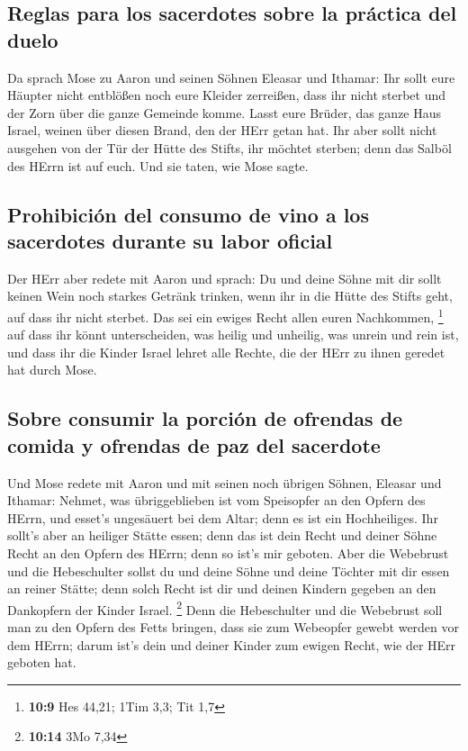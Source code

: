 \hypertarget{reglas-para-los-sacerdotes-sobre-la-pruxe1ctica-del-duelo}{%
\subsection{Reglas para los sacerdotes sobre la práctica del
duelo}\label{reglas-para-los-sacerdotes-sobre-la-pruxe1ctica-del-duelo}}

 Da sprach Mose zu Aaron und seinen Söhnen Eleasar und
Ithamar: Ihr sollt eure Häupter nicht entblößen noch eure Kleider
zerreißen, dass ihr nicht sterbet und der Zorn über die ganze Gemeinde
komme. Lasst eure Brüder, das ganze Haus Israel, weinen über diesen
Brand, den der HErr getan hat.  Ihr aber sollt nicht
ausgehen von der Tür der Hütte des Stifts, ihr möchtet sterben; denn das
Salböl des HErrn ist auf euch. Und sie taten, wie Mose sagte.

\hypertarget{prohibiciuxf3n-del-consumo-de-vino-a-los-sacerdotes-durante-su-labor-oficial}{%
\subsection{Prohibición del consumo de vino a los sacerdotes durante su
labor
oficial}\label{prohibiciuxf3n-del-consumo-de-vino-a-los-sacerdotes-durante-su-labor-oficial}}

 Der HErr aber redete mit Aaron und sprach: 
Du und deine Söhne mit dir sollt keinen Wein noch starkes Getränk
trinken, wenn ihr in die Hütte des Stifts geht, auf dass ihr nicht
sterbet. Das sei ein ewiges Recht allen euren Nachkommen, \footnote{\textbf{10:9}
  Hes 44,21; 1Tim 3,3; Tit 1,7}  auf dass ihr könnt
unterscheiden, was heilig und unheilig, was unrein und rein ist,
 und dass ihr die Kinder Israel lehret alle Rechte, die
der HErr zu ihnen geredet hat durch Mose.

\hypertarget{sobre-consumir-la-porciuxf3n-de-ofrendas-de-comida-y-ofrendas-de-paz-del-sacerdote}{%
\subsection{Sobre consumir la porción de ofrendas de comida y ofrendas
de paz del
sacerdote}\label{sobre-consumir-la-porciuxf3n-de-ofrendas-de-comida-y-ofrendas-de-paz-del-sacerdote}}

 Und Mose redete mit Aaron und mit seinen noch übrigen
Söhnen, Eleasar und Ithamar: Nehmet, was übriggeblieben ist vom
Speisopfer an den Opfern des HErrn, und esset's ungesäuert bei dem
Altar; denn es ist ein Hochheiliges.  Ihr sollt's aber an
heiliger Stätte essen; denn das ist dein Recht und deiner Söhne Recht an
den Opfern des HErrn; denn so ist's mir geboten.  Aber
die Webebrust und die Hebeschulter sollst du und deine Söhne und deine
Töchter mit dir essen an reiner Stätte; denn solch Recht ist dir und
deinen Kindern gegeben an den Dankopfern der Kinder Israel. \footnote{\textbf{10:14}
  3Mo 7,34}  Denn die Hebeschulter und die Webebrust soll
man zu den Opfern des Fetts bringen, dass sie zum Webeopfer gewebt
werden vor dem HErrn; darum ist's dein und deiner Kinder zum ewigen
Recht, wie der HErr geboten hat.

